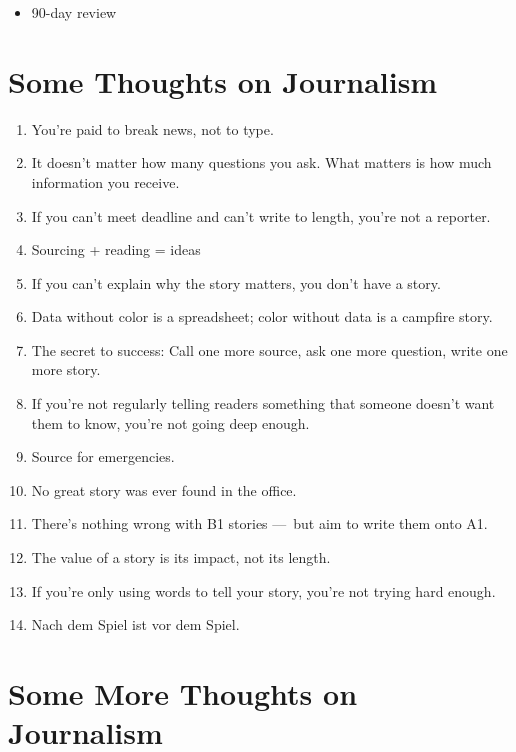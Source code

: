 \documentclass[
  11pt,
  american,
  letterpaperpaper,
  extrafontsizes,onecolumn,openright
  ]{memoir}
\providecommand{\tightlist}{%
  \setlength{\itemsep}{0pt}\setlength{\parskip}{0pt}}
\begin{document}
\begin{itemize}
\tightlist
\item
  90-day review
\end{itemize}

\mainmatter

\hypertarget{some-thoughts-on-journalism}{%
\chapter*{Some Thoughts on Journalism}\label{some-thoughts-on-journalism}}

\begin{enumerate}
\def\labelenumi{\arabic{enumi}.}
\tightlist
\item
  You're paid to break news, not to type.~
\item
  It doesn't matter how many questions you ask. What matters is how much information you receive.
\item
  If you can't meet deadline and can't write to length, you're not a reporter.~
\item
  Sourcing + reading = ideas
\item
  If you can't explain why the story matters, you don't have a story.~
\item
  Data without color is a spreadsheet; color without data is a campfire story.~
\item
  The secret to success: Call one more source, ask one more question, write one more story.~
\item
  If you're not regularly telling readers something that someone doesn't want them to know, you're not going deep enough.
\item
  Source for emergencies.
\item
  No great story was ever found in the office.~
\item
  There's nothing wrong with B1 stories ---~but aim to write them onto A1.~
\item
  The value of a story is its impact, not its length.~
\item
  If you're only using words to tell your story, you're not trying hard enough.~
\item
  Nach dem Spiel ist vor dem Spiel.
\end{enumerate}

\hypertarget{some-more-thoughts-on-journalism}{%
\chapter*{Some More Thoughts on Journalism}\label{some-more-thoughts-on-journalism}}
\end{document}
